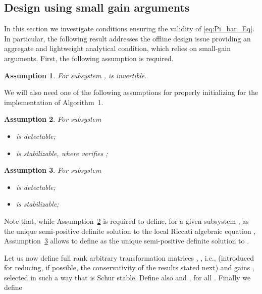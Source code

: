 \documentclass[journal,10pt,draftcls,onecolumn]{IEEEtran}
\newtheorem{assumption}{Assumption}
\begin{document}
\subsection{Design using small gain arguments}
\label{subsec:convergence:smallgain}
In this section we investigate conditions ensuring the validity of \eqref{eq:Pi_bar_Eq}. In particular,
the following result addresses the offline design issue providing an aggregate and lightweight analytical condition, which relies on small-gain arguments. First, the following assumption is required.
\begin{assumption}
\label{ass:local-in} For subsystem ,  is invertible.\hfill
\end{assumption}
We will also need one of the following assumptions for properly initializing  for the implementation of Algorithm~1.
\begin{assumption}
\label{ass:local-det1}For subsystem 
\begin{itemize}
\item[(i)]  is detectable;
\item[(ii)]  is stabilizable, where  verifies ;
\end{itemize}
\end{assumption}
\begin{assumption}
\label{ass:local-det2}For subsystem 
\begin{itemize}
\item[(i)]  is detectable;
\item[(ii)]  is stabilizable;
\end{itemize}
\end{assumption}
Note that, while Assumption~\ref{ass:local-det1} is required to define, for a given subsystem ,  as the unique semi-positive definite solution to the local Riccati algebraic equation , Assumption~\ref{ass:local-det2} allows to define  as the unique semi-positive definite solution to .

Let us now define full rank  arbitrary transformation matrices , , i.e.,  (introduced for reducing, if possible, the conservativity of the results stated next) and gains , selected in such a way that  is Schur stable.
Define also  and , for all .
Finally we define
\end{document}
